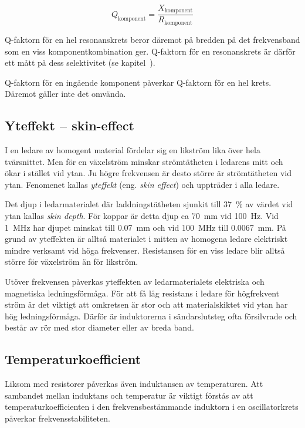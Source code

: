 \[Q_{\text{komponent}} = \dfrac{X_{\text{komponent}}}{R_{\text{komponent}}}\]

Q-faktorn för en hel resonanskrets beror däremot på bredden på det
frekvensband som en viss komponentkombination ger.
Q-faktorn för en resonanskrets är därför ett mått på dess
selektivitet (se kapitel~).

Q-faktorn för en ingående komponent påverkar Q-faktorn för en hel krets.
Däremot gäller inte det omvända.

\subsection{Yteffekt -- skin-effect}

I en ledare av homogent material fördelar sig en likström lika över hela
tvärsnittet.
Men för en växelström minskar strömtätheten i ledarens mitt och ökar i stället
vid ytan.
Ju högre frekvensen är desto större är strömtätheten vid ytan.
Fenomenet kallas \emph{yteffekt} (eng. \emph{skin effect}) och uppträder i alla
ledare.

Det djup i ledarmaterialet där laddningstätheten sjunkit till \qty{37}{\percent}
av värdet vid ytan kallas \emph{skin depth}.
För koppar är detta djup ca \qty{70}{\milli\metre} vid \qty{100}{\hertz}.
Vid \qty{1}{\mega\hertz} har djupet minskat till \qty{0,07}{\milli\metre} och
vid \qty{100}{\mega\hertz} till \qty{0,0067}{\milli\metre}.
På grund av yteffekten är alltså materialet i mitten av homogena ledare
elektriskt mindre verksamt vid höga frekvenser.
Resistansen för en viss ledare blir alltså större för växelström än för likström.

Utöver frekvensen påverkas yteffekten av ledarmaterialets elektriska och
magnetiska ledningsförmåga.
För att få låg resistans i ledare för högfrekvent ström är det viktigt att
omkretsen är stor och att materialskiktet vid ytan har hög ledningsförmåga.
Därför är induktorerna i sändarslutsteg ofta försilvrade och består av rör med
stor diameter eller av breda band.

\subsection{Temperaturkoefficient}

Liksom med resistorer påverkas även induktansen av temperaturen.
Att sambandet mellan induktans och temperatur är viktigt förstås av att
temperaturkoefficienten i den frekvensbestämmande induktorn i en oscillatorkrets
påverkar frekvensstabiliteten.

